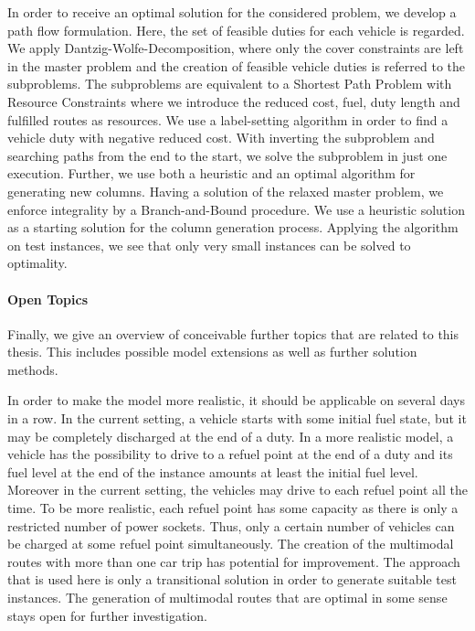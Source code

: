 In order to receive an optimal solution for the considered problem, we develop a path flow formulation. Here, the set of feasible duties for each vehicle is regarded. We apply Dantzig-Wolfe-Decomposition, where only the cover constraints are left in the master problem and the creation of feasible vehicle duties is referred to the subproblems. The subproblems are equivalent to a Shortest Path Problem with Resource Constraints where we introduce the reduced cost, fuel, duty length and fulfilled routes as resources. We use a label-setting algorithm in order to find a vehicle duty with negative reduced cost. With inverting the subproblem and searching paths from the end to the start, we solve the subproblem in just one execution. Further, we use both a heuristic and an optimal algorithm for generating new columns. Having a solution of the relaxed master problem, we enforce integrality by a Branch-and-Bound procedure. We use a heuristic solution as a starting solution for the column generation process. Applying the algorithm on test instances, we see that only very small instances can be solved to optimality.

\paragraph{Open Topics} \parfill

Finally, we give an overview of conceivable further topics that are related to this thesis. This includes possible model extensions as well as further solution methods. 

In order to make the model more realistic, it should be applicable on several days in a row. In the current setting, a vehicle starts with some initial fuel state, but it may be completely discharged at the end of a duty. In a more realistic model, a vehicle has the possibility to drive to a refuel point at the end of a duty and its fuel level at the end of the instance amounts at least the initial fuel level. Moreover in the current setting, the vehicles may drive to each refuel point all the time. To be more realistic, each refuel point has some capacity as there is only a restricted number of power sockets. Thus, only a certain number of vehicles can be charged at some refuel point simultaneously. The creation of the multimodal routes with more than one car trip has potential for improvement. The approach that is used here is only a transitional solution in order to generate suitable test instances. The generation of multimodal routes that are optimal in some sense stays open for further investigation.

